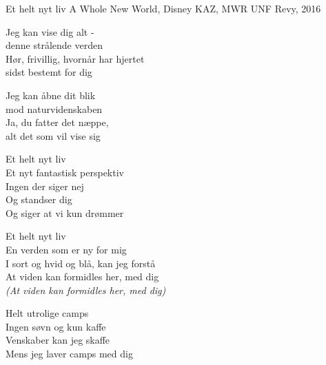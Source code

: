 \begin{song}{Et helt nyt liv}
  {} %
  {A Whole New World, Disney} %
  {KAZ, MWR} %
  {UNF Revy, 2016} %
  {\NotCCLIed} %

  \begin{SBVerse}
    Jeg kan vise dig alt -\\
    denne strålende verden\\
    Hør, frivillig, hvornår har hjertet\\
    sidst bestemt for dig
  \end{SBVerse}

  \begin{SBVerse}
    Jeg kan åbne dit blik\\
    mod naturvidenskaben\\
    Ja, du fatter det næppe,\\
    alt det som vil vise sig
  \end{SBVerse}

  \begin{SBChorus}
    Et helt nyt liv\\
    Et nyt fantastisk perspektiv\\
    Ingen der siger nej\\
    Og standser dig\\
    Og siger at vi kun drømmer
  \end{SBChorus}

  \begin{SBChorus}
    Et helt nyt liv\\
    En verden som er ny for mig\\
    I sort og hvid og blå, kan jeg forstå\\
    At viden kan formidles her, med dig\\
    \emph{(At viden kan formidles her, med dig)}
  \end{SBChorus}

  \begin{SBVerse}
    Helt utrolige camps\\
    Ingen søvn og kun kaffe\\
    Venskaber kan jeg skaffe\\
    Mens jeg laver camps med dig
  \end{SBVerse}


\end{song}
